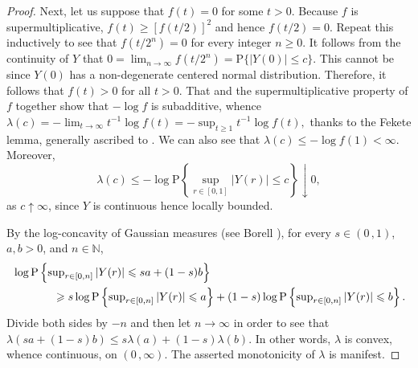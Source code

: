 \documentclass[reqno]{amsart}
\newcommand{\<}{\langle}
\renewcommand{\>}{\rangle}
\newcommand{\N}{\mathbb{N}}
\renewcommand{\P}{\mathrm{P}}
\newcommand{\1}{\mathbb{1}}
\renewcommand{\ge}{\geqslant}
\renewcommand{\le}{\leqslant}
\theoremstyle{definition}
\numberwithin{equation}{section}
\begin{document}
\begin{proof}
	Next, let us suppose that
	$f(t)=0$ for some $t>0$. Because $f$ is supermultiplicative, 
	$f(t)\ge [f(t/2)]^2$ and hence $f(t/2)=0$. Repeat this inductively to see that
	$f(t/2^n)=0$ for every integer $n\ge0$. It follows from the continuity of $Y$ that
	$0 = \lim_{n\to\infty} f(t/2^n) = \P\{|Y(0)|\le c\}.$
	This cannot be since $Y(0)$ has a non-degenerate centered normal
	distribution. Therefore, it follows that $f(t)>0$ for all $t>0$. That and the supermultiplicative
	property of $f$ together show that $-\log f$ is subadditive, whence
	$\lambda(c) = -\lim_{t\to\infty} t^{-1}\log f(t) = -\sup_{t\ge1} t^{-1}\log f(t),$
	thanks to the Fekete lemma, generally ascribed to \cite{Fekete}. We can also see that
	$\lambda(c) \le -\log f(1) <\infty$. Moreover,
	\begin{equation}\label{lambda:UB}\textstyle
		\lambda(c) \le -\log\P\left\{\sup_{r\in[0,1]}|Y(r)|\le c\right\}\downarrow0,
	\end{equation}
	as $c\uparrow\infty$, since $Y$ is continuous hence locally bounded.
	
	By the log-concavity of Gaussian measures 
	(see Borell \cite[Corollary 2.1]{Borell74}), for every $s \in (0\,,1)$, $a,b>0$, 
	and $n \in \N$,
	\begin{align*}
		&\textstyle \log\P\left\{ \sup_{r\in[0,n]}|Y(r)| \le sa + (1-s)b \right\}\\
		&\hskip0.5in\textstyle \ge s\log\P\left\{ \sup_{r\in[0,n]}|Y(r)| \le a \right\}
		+ (1-s)\log\P\left\{ \sup_{r\in[0,n]}|Y(r)| \le b \right\}.
	\end{align*}
	Divide both sides by $-n$ and then let $n\to\infty$ in order to see that
	$\lambda(sa+(1-s)b) \le s\lambda(a)+(1-s)\lambda(b).$
	In other words, $\lambda$ is convex, 
	whence continuous, on $(0\,,\infty)$. The asserted monotonicity of $\lambda$ is 
	manifest. 
	

\end{proof}
\end{document}
